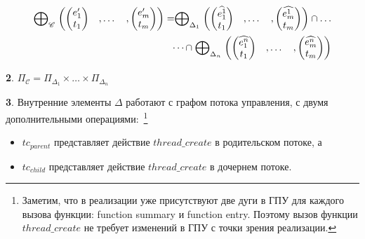 \begin{equation}
\label{composite_epp_def}
\begin{aligned}
\mathrel{\bigoplus}_{\mathscr{C}}
\begin{pmatrix}
\begin{pmatrix}
e_1' \\
t_1 
\end{pmatrix}& ,
\dots& ,
\begin{pmatrix}
e_m' \\
t_m 
\end{pmatrix}
\end{pmatrix} = 
\mathrel{\bigoplus}_{\Delta_1}
\begin{pmatrix}
\begin{pmatrix}
\widehat{e^1_1} \\
t_1 
\end{pmatrix}& ,
\dots& ,
\begin{pmatrix}
\widehat{e^1_m} \\
t_m 
\end{pmatrix}
\end{pmatrix} \cap \dots \\
 \dots \cap 
\mathrel{\bigoplus}_{\Delta_n}
\begin{pmatrix}
\begin{pmatrix}
\widehat{e^n_1} \\
t_1 
\end{pmatrix}& ,
\dots& ,
\begin{pmatrix}
\widehat{e^n_m} \\
t_m 
\end{pmatrix}
\end{pmatrix}  
\end{aligned}
\end{equation}

{\textbf 2.} $\Pi_{\mathscr{C}} = \Pi_{\Delta_1} \times \dots \times \Pi_{\Delta_n}$

{\textbf 3.}
Внутренние элементы $\Delta$ работают с графом потока управления, с двумя дополнительными операциями:~\footnote{Заметим, что в реализации \cpachecker уже присутствуют две дуги в ГПУ для каждого вызова функции: function summary и function entry. Поэтому вызов функции $thread\_create$ не требует изменений в ГПУ с точки зрения реализации.}
\begin{itemize}
\item $tc_{parent}$ представляет действие $thread\_create$ в родительском потоке, а
\item $tc_{child}$ представляет действие $thread\_create$ в дочернем потоке.
\end{itemize}

